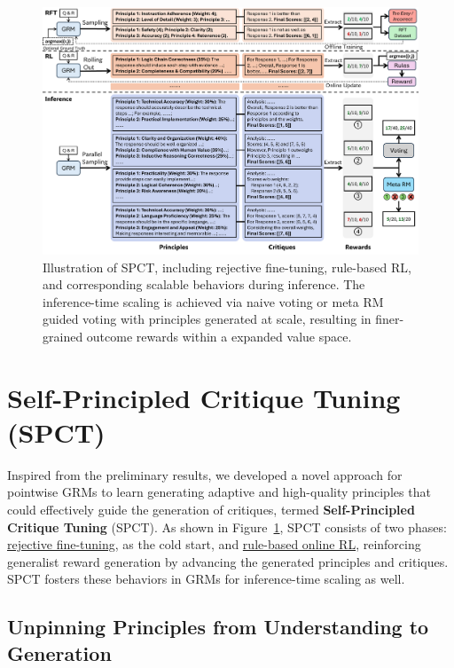 \documentclass{article} %
\begin{document}
\begin{figure}[t]
  \centering
  \includegraphics[width=\textwidth]{figures/fig3.pdf}
  \caption{Illustration of SPCT, including rejective fine-tuning, rule-based RL, and corresponding scalable behaviors during inference. The inference-time scaling is achieved via naive voting or meta RM guided voting with principles generated at scale, resulting in finer-grained outcome rewards within a expanded value space.}
  \label{fig:method-overview}
  \vspace{-1em}
\end{figure}

\vspace{-0.5em}
\section{Self-Principled Critique Tuning (SPCT)}

Inspired from the preliminary results, we developed a novel approach for pointwise GRMs to learn generating adaptive and high-quality principles that could effectively guide the generation of critiques, termed \textbf{Self-Principled Critique Tuning} (SPCT). As shown in Figure~\ref{fig:method-overview}, SPCT consists of two phases: \uline{rejective fine-tuning}, as the cold start, and \uline{rule-based online RL}, reinforcing generalist reward generation by advancing the generated principles and critiques. SPCT fosters these behaviors in GRMs for inference-time scaling as well. 

\vspace{-0.5em}
\subsection{Unpinning Principles from Understanding to Generation}
\end{document}
